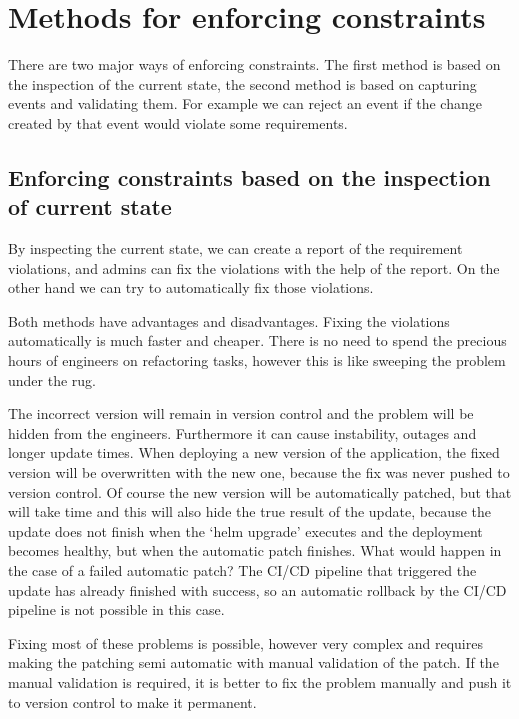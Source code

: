 \setlength{\parindent}{0pt}
\setlength{\parskip}{0.6em}

\chapter{Methods for enforcing constraints}
\label{sec:enforcingMethods}

There are two major ways of enforcing constraints. The first method is based on the inspection of the current state, the second method is based on capturing events and validating them. For example we can reject an event if the change created by that event would violate some requirements.

\section[State inspection based]{Enforcing constraints based on the inspection of current state}

By inspecting the current state, we can create a report of the requirement violations, and admins can fix the violations with the help of the report. On the other hand we can try to automatically fix those violations.

Both methods have advantages and disadvantages. Fixing the violations automatically is much faster and cheaper. There is no need to spend the precious hours of engineers on refactoring tasks, however this is like sweeping the problem under the rug. 

The incorrect version will remain in version control and the problem will be hidden from the engineers. Furthermore it can cause instability, outages and longer update times. When deploying a new version of the application, the fixed version will be overwritten with the new one, because the fix was never pushed to version control. Of course the new version will be automatically patched, but that will take time and this will also hide the true result of the update, because the update does not finish when the `helm upgrade' executes and the deployment becomes healthy, but when the automatic patch finishes. What would happen in the case of a failed automatic patch? The CI/CD pipeline that triggered the update has already finished with success, so an automatic rollback by the CI/CD pipeline is not possible in this case.

Fixing most of these problems is possible, however very complex and requires making the patching semi automatic with manual validation of the patch. If the manual validation is required, it is better to fix the problem manually and push it to version control to make it permanent.





